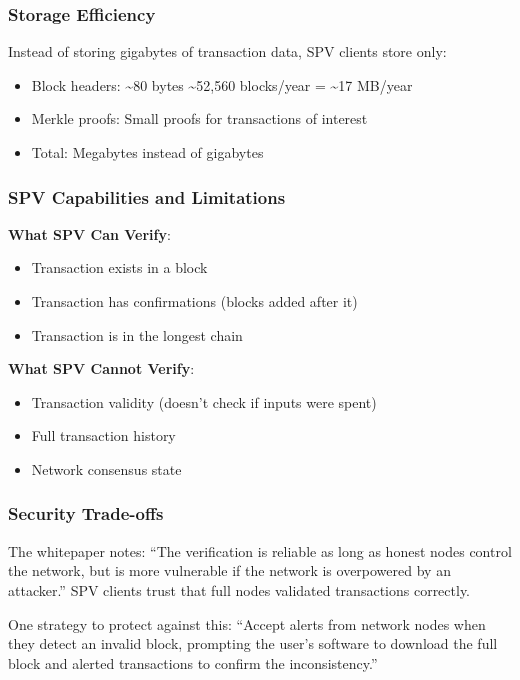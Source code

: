 \subsubsection{Storage Efficiency}

Instead of storing gigabytes of transaction data, SPV clients store only:

\begin{itemize}
  \item Block headers: \textasciitilde80 bytes \texttimes \textasciitilde52,560 blocks/year = \textasciitilde17 MB/year
  \item Merkle proofs: Small proofs for transactions of interest
  \item Total: Megabytes instead of gigabytes
\end{itemize}

\subsubsection{SPV Capabilities and Limitations}

\textbf{What SPV Can Verify}:
\begin{itemize}
  \item Transaction exists in a block
  \item Transaction has confirmations (blocks added after it)
  \item Transaction is in the longest chain
\end{itemize}

\textbf{What SPV Cannot Verify}:
\begin{itemize}
  \item Transaction validity (doesn't check if inputs were spent)
  \item Full transaction history
  \item Network consensus state
\end{itemize}

\subsubsection{Security Trade-offs}

The whitepaper notes: ``The verification is reliable as long as honest nodes control the network, but is more vulnerable if the network is overpowered by an attacker.'' SPV clients trust that full nodes validated transactions correctly.

One strategy to protect against this: ``Accept alerts from network nodes when they detect an invalid block, prompting the user's software to download the full block and alerted transactions to confirm the inconsistency.''

